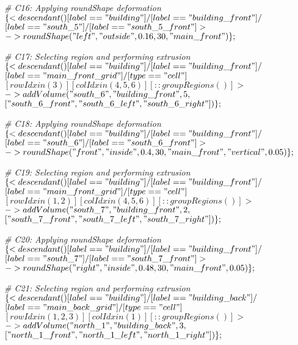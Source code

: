 \noindent \textit{\# C16: Applying roundShape deformation}\\
$\{< descendant() [label=="building"] / [label=="building\_front"] / $\\
$[label=="south\_5"] / [label=="south\_5\_front"] > $\\
$-> roundShape("left", "outside", 0.16, 30, "main\_front")\};$

\noindent \textit{\# C17: Selecting region and performing extrusion}\\
$\{< descendant() [label=="building"] / [label=="building\_front"] / $\\
$[label=="main\_front\_grid"] / [type=="cell"] $\\
$[rowIdx in (3)] [colIdx in (4, 5, 6)] [::groupRegions()] > $\\
$-> addVolume("south\_6", "building\_front", 5, $\\
$["south\_6\_front", "south\_6\_left", "south\_6\_right"])\};$

\noindent \textit{\# C18: Applying roundShape deformation}\\
$\{< descendant() [label=="building"] / [label=="building\_front"] / $\\
$[label=="south\_6"] / [label=="south\_6\_front"] > $\\
$-> roundShape("front", "inside", 0.4, 30, "main\_front", "vertical", 0.05)\};$

\noindent \textit{\# C19: Selecting region and performing extrusion}\\
$\{< descendant() [label=="building"] / [label=="building\_front"] / $\\
$[label=="main\_front\_grid"] / [type=="cell"] $\\
$[rowIdx in (1, 2)] [colIdx in (4, 5, 6)] [::groupRegions()] > $\\
$-> addVolume("south\_7", "building\_front", 2, $\\
$["south\_7\_front", "south\_7\_left", "south\_7\_right"])\};$

\noindent \textit{\# C20: Applying roundShape deformation}\\
$\{< descendant() [label=="building"] / [label=="building\_front"] / $\\
$[label=="south\_7"] / [label=="south\_7\_front"] > $\\
$-> roundShape("right", "inside", 0.48, 30, "main\_front", 0.05)\};$

\noindent \textit{\# C21: Selecting region and performing extrusion}\\
$\{< descendant() [label=="building"] / [label=="building\_back"] / $\\
$[label=="main\_back\_grid"] / [type=="cell"] $\\
$[rowIdx in (1, 2, 3)] [colIdx in (1)] [::groupRegions()] > $\\
$-> addVolume("north\_1", "building\_back", 3, $\\
$["north\_1\_front", "north\_1\_left", "north\_1\_right"])\};$

